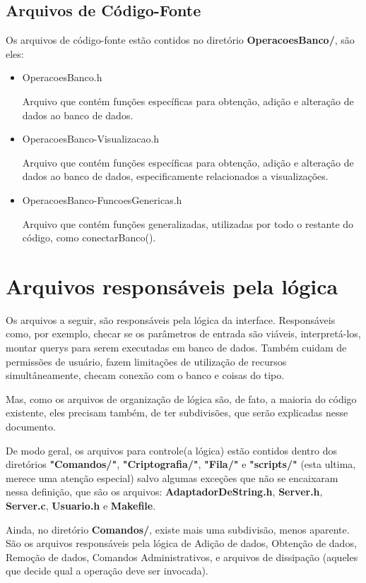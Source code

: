 \documentclass[onecolumn,12pt]{article}
\begin{document}
    		\subsection{Arquivos de Código-Fonte}
    			Os arquivos de código-fonte estão contidos no diretório \textbf{OperacoesBanco/}, são eles:
    			\begin{itemize}
    				\item OperacoesBanco.h\par
    					Arquivo que contém funções específicas para obtenção, adição e alteração de dados ao banco de dados.
    				\item OperacoesBanco-Visualizacao.h\par
    					Arquivo que contém funções específicas para obtenção, adição e alteração de dados ao banco de dados, especificamente relacionados a visualizações.
    				\item OperacoesBanco-FuncoesGenericas.h\par
    					Arquivo que contém funções generalizadas, utilizadas por todo o restante do código, como conectarBanco().
    			\end{itemize}
	
		\section{Arquivos responsáveis pela lógica}
			Os arquivos a seguir, são responsáveis pela lógica da interface. Responsáveis como, por exemplo, checar se os parâmetros de entrada são viáveis, interpretá-los, montar querys para serem executadas em banco de dados. Também cuidam de permissões de usuário, fazem limitações de utilização de recursos simultâneamente, checam conexão com o banco e coisas do tipo.\par
			Mas, como os arquivos de organização de lógica são, de fato, a maioria do código existente, eles precisam também, de ter subdivisões, que serão explicadas nesse documento.\par
			De modo geral, os arquivos para controle(a lógica) estão contidos dentro dos diretórios \textbf{"Comandos/"}, \textbf{"Criptografia/"}, \textbf{"Fila/"} e \textbf{"scripts/"} (esta ultima, merece uma atenção especial) salvo algumas exceções que não se encaixaram nessa definição, que são os arquivos: \textbf{AdaptadorDeString.h}, \textbf{Server.h}, \textbf{Server.c}, \textbf{Usuario.h} e \textbf{Makefile}.\par
			Ainda, no diretório \textbf{Comandos/}, existe mais uma subdivisão, menos aparente. São os arquivos responsáveis pela lógica de Adição de dados, Obtenção de dados, Remoção de dados, Comandos Administrativos, e arquivos de dissipação (aqueles que decide qual a operação deve ser invocada).
\end{document}
